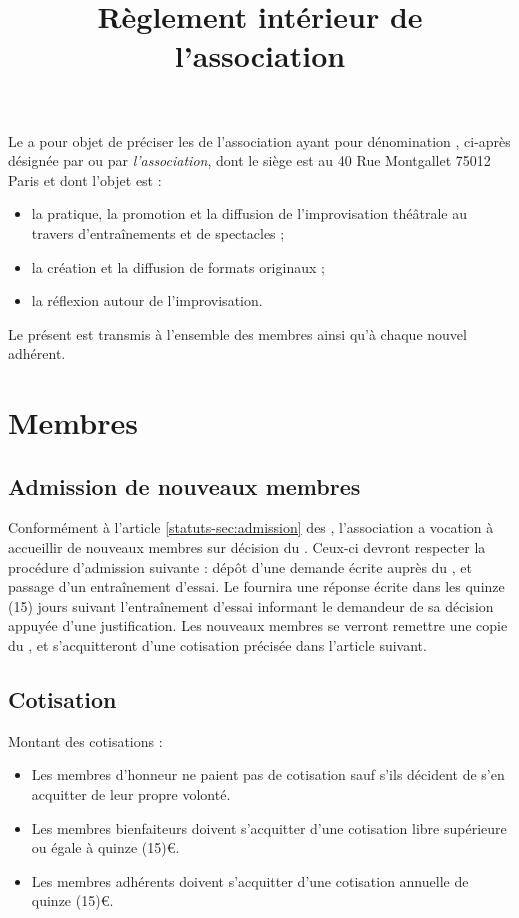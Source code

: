 \documentclass[a4paper,french,10pt]{article}
\title{Règlement intérieur de l'association \metae{}}
\newcommand{\article}[1]{\subsection{#1}\addtocounter{article}{1}}
\newcounter{article}
\newcommand{\artrefst}[1]{article \ref{statuts-#1} des \statuts{}}
\begin{document}
\date{}

\maketitle 
\pagestyle{fancy} 


\rhead{\thepage} 
\cfoot{} 


Le \RI{} a pour objet de préciser les \statuts{} de l'association ayant pour dénomination \textit{\metae{}}, ci-après désignée par \textit{\meta{}} ou par \textit{l'association}, dont le siège est au 40 Rue Montgallet 75012 Paris et dont l'objet est :
\begin{itemize}
\item la pratique, la promotion et la diffusion de l'improvisation théâtrale au travers d'entraînements et de spectacles ;
\item la création et la diffusion de formats originaux ;
\item la réflexion autour de l'improvisation.
\end{itemize}

Le présent \RI{} est transmis à l'ensemble des membres ainsi qu'à chaque nouvel adhérent.

\setcounter{article}{1}
\section{Membres}

\article{Admission de nouveaux membres}
\label{sec:admiss-de-nouv}

Conformément à l'\artrefst{sec:admission}, l'association \meta{} a vocation à accueillir de nouveaux membres sur décision du \bureau{}. Ceux-ci devront respecter la procédure d'admission suivante : dépôt d'une demande écrite auprès du \bureau{}, et passage d'un entraînement d'essai. Le \bureau{} fournira une réponse écrite dans les quinze (15) jours suivant l'entraînement d'essai informant le demandeur de sa décision appuyée d'une justification. Les nouveaux membres se verront remettre une copie du \RI{}, et s'acquitteront d'une cotisation précisée dans l'article suivant.

\article{Cotisation}
\label{sec:cotisation}
Montant des cotisations :

\begin{itemize}
\item Les membres d'honneur ne paient pas de cotisation sauf s'ils décident de s'en acquitter de leur propre volonté.
\item Les membres bienfaiteurs doivent s'acquitter d'une cotisation libre supérieure ou égale à quinze (15)\euro{}.
\item Les membres adhérents doivent s'acquitter d'une cotisation annuelle de quinze (15)\euro{}.
\end{itemize}
\end{document}
